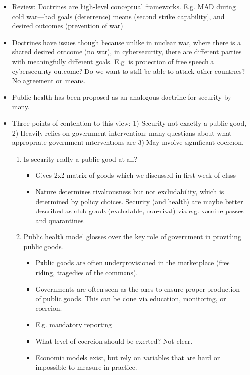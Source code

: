 \documentclass[11pt]{article}
\begin{document}
\begin{itemize}
    \item Review: Doctrines are high-level conceptual frameworks. E.g. MAD during cold war---had goals (deterrence) means (second strike capability), and desired outcomes (prevention of war)
    \item Doctrines have issues though because unlike in nuclear war, where there is a shared desired outcome (no war), in cybersecurity, there are different parties with meaningfully different goals. E.g. is protection of free speech a cybersecurity outcome? Do we want to still be able to attack other countries? No agreement on means. 
    \item Public health has been proposed as an analogous doctrine for security by many.
    \item Three points of contention to this view: 1) Security not exactly a public good, 2) Heavily relies on government intervention; many questions about what appropriate government interventions are 3) May involve significant coercion. 
    \begin{enumerate}
        \item Is security really a public good at all?
        \begin{itemize}
            \item Gives 2x2 matrix of goods which we discussed in first week of class
            \item Nature determines rivalrousness but not excludability, which is determined by policy choices. Security (and health) are maybe better described as club goods (excludable, non-rival) via e.g. vaccine passes and quarantines.
        \end{itemize}
        \item Public health model glosses over the key role of government in providing public goods. 
        \begin{itemize}
            \item Public goods are often underprovisioned in the marketplace (free riding, tragedies of the commons).
            \item Governments are often seen as the ones to ensure proper production of public goods. This can be done via education, monitoring, or coercion. 
            \item E.g. mandatory reporting 
            \item What level of coercion should be exerted? Not clear.
            \item Economic models exist, but rely on variables that are hard or impossible to measure in practice. 

\end{itemize}
\end{enumerate}
\end{itemize}
\end{document}
